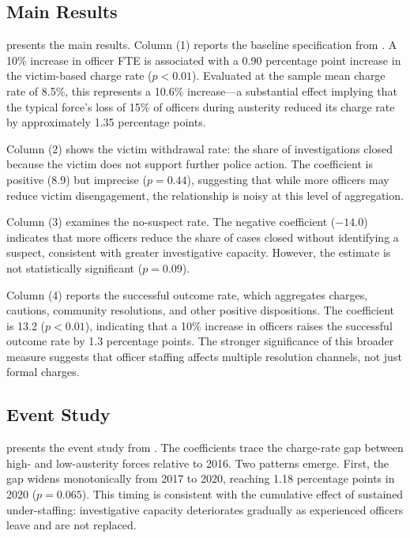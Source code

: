 \documentclass[12pt]{article}
\begin{document}
\subsection{Main Results}

 presents the main results. Column (1) reports the baseline specification from . A 10\% increase in officer FTE is associated with a 0.90 percentage point increase in the victim-based charge rate ($p < 0.01$). Evaluated at the sample mean charge rate of 8.5\%, this represents a 10.6\% increase---a substantial effect implying that the typical force's loss of 15\% of officers during austerity reduced its charge rate by approximately 1.35 percentage points.

Column (2) shows the victim withdrawal rate: the share of investigations closed because the victim does not support further police action. The coefficient is positive (8.9) but imprecise ($p = 0.44$), suggesting that while more officers may reduce victim disengagement, the relationship is noisy at this level of aggregation.

Column (3) examines the no-suspect rate. The negative coefficient ($-14.0$) indicates that more officers reduce the share of cases closed without identifying a suspect, consistent with greater investigative capacity. However, the estimate is not statistically significant ($p = 0.09$).

Column (4) reports the successful outcome rate, which aggregates charges, cautions, community resolutions, and other positive dispositions. The coefficient is 13.2 ($p < 0.01$), indicating that a 10\% increase in officers raises the successful outcome rate by 1.3 percentage points. The stronger significance of this broader measure suggests that officer staffing affects multiple resolution channels, not just formal charges.



\subsection{Event Study}

 presents the event study from . The coefficients trace the charge-rate gap between high- and low-austerity forces relative to 2016. Two patterns emerge. First, the gap widens monotonically from 2017 to 2020, reaching 1.18 percentage points in 2020 ($p = 0.065$). This timing is consistent with the cumulative effect of sustained under-staffing: investigative capacity deteriorates gradually as experienced officers leave and are not replaced.
\end{document}
